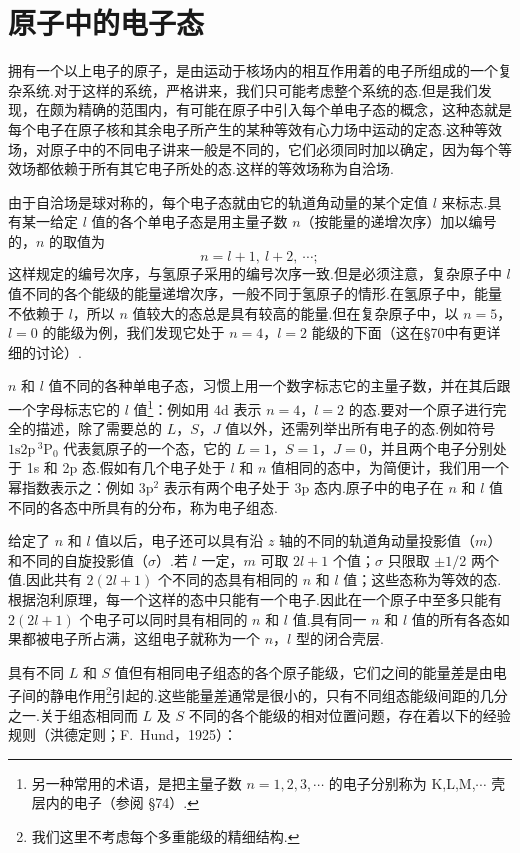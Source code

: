 \section{原子中的电子态}

拥有一个以上电子的原子，是由运动于核场内的相互作用着的电子所组成的一个复杂系统.对于这样的系统，严格讲来，我们只可能考虑整个系统的态.但是我们发现，在颇为精确的范围内，有可能在原子中引入每个单电子态的概念，这种态就是每个电子在原子核和其余电子所产生的某种等效有心力场中运动的定态.这种等效场，对原子中的不同电子讲来一般是不同的，它们必须同时加以确定，因为每个等效场都依赖于所有其它电子所处的态.这样的等效场称为自洽场.

由于自洽场是球对称的，每个电子态就由它的轨道角动量的某个定值 $l$ 来标志.具有某一给定 $l$ 值的各个单电子态是用主量子数 $n$（按能量的递增次序）加以编号的，$n$ 的取值为
\begin{equation*}
  n=l+1,\ l+2,\ \cdots;
\end{equation*}
这样规定的编号次序，与氢原子采用的编号次序一致.但是必须注意，复杂原子中 $l$ 值不同的各个能级的能量递增次序，一般不同于氢原子的情形.在氢原子中，能量不依赖于 $l$，所以 $n$ 值较大的态总是具有较高的能量.但在复杂原子中，以 $n=5$，$l=0$ 的能级为例，我们发现它处于 $n=4$，$l=2$ 能级的下面（这在§70中有更详细的讨论）.

$n$ 和 $l$ 值不同的各种单电子态，习惯上用一个数字标志它的主量子数，并在其后跟一个字母标志它的 $l$ 值\footnote{另一种常用的术语，是把主量子数 $n=1,2,3,\cdots$ 的电子分别称为 K,L,M,$\cdots$ 壳层内的电子（参阅 §74）.}：例如用 4d 表示 $n=4$，$l=2$ 的态.要对一个原子进行完全的描述，除了需要总的 $L$，$S$，$J$ 值以外，还需列举出所有电子的态.例如符号 $1\mathrm{s}2\mathrm{p}\,{}^{3}\mathrm{P}_{0}$ 代表氦原子的一个态，它的 $L=1$，$S=1$，$J=0$，并且两个电子分别处于 1s 和 2p 态.假如有几个电子处于 $l$ 和 $n$ 值相同的态中，为简便计，我们用一个幂指数表示之：例如 $3\mathrm{p}^{2}$ 表示有两个电子处于 3p 态内.原子中的电子在 $n$ 和 $l$ 值不同的各态中所具有的分布，称为电子组态.

给定了 $n$ 和 $l$ 值以后，电子还可以具有沿 $z$ 轴的不同的轨道角动量投影值（$m$）和不同的自旋投影值（$\sigma$）.若 $l$ 一定，$m$ 可取 $2l+1$ 个值；$\sigma$ 只限取 $\pm1/2$ 两个值.因此共有 $2(2l+1)$ 个不同的态具有相同的 $n$ 和 $l$ 值；这些态称为等效的态.根据泡利原理，每一个这样的态中只能有一个电子.因此在一个原子中至多只能有 $2(2l+1)$ 个电子可以同时具有相同的 $n$ 和 $l$ 值.具有同一 $n$ 和 $l$ 值的所有各态如果都被电子所占满，这组电子就称为一个 $n$，$l$ 型的闭合壳层.

具有不同 $L$ 和 $S$ 值但有相同电子组态的各个原子能级，它们之间的能量差是由电子间的静电作用\footnote{我们这里不考虑每个多重能级的精细结构.}引起的.这些能量差通常是很小的，只有不同组态能级间距的几分之一.关于组态相同而 $L$ 及 $S$ 不同的各个能级的相对位置问题，存在着以下的经验规则（洪德定则；F.~Hund，1925）：

